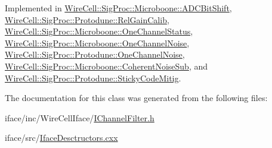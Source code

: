 Implemented in \hyperlink{class_wire_cell_1_1_sig_proc_1_1_microboone_1_1_a_d_c_bit_shift_a6815b2cc680e5fb222239f2875773352}{Wire\+Cell\+::\+Sig\+Proc\+::\+Microboone\+::\+A\+D\+C\+Bit\+Shift}, \hyperlink{class_wire_cell_1_1_sig_proc_1_1_protodune_1_1_rel_gain_calib_afa25d6774f5ea8bf33ba28494ef2a0f4}{Wire\+Cell\+::\+Sig\+Proc\+::\+Protodune\+::\+Rel\+Gain\+Calib}, \hyperlink{class_wire_cell_1_1_sig_proc_1_1_microboone_1_1_one_channel_status_a4719e79f3e553512387a4de632451818}{Wire\+Cell\+::\+Sig\+Proc\+::\+Microboone\+::\+One\+Channel\+Status}, \hyperlink{class_wire_cell_1_1_sig_proc_1_1_microboone_1_1_one_channel_noise_a89d35e0006bd5a44cdd046e2d9549fa4}{Wire\+Cell\+::\+Sig\+Proc\+::\+Microboone\+::\+One\+Channel\+Noise}, \hyperlink{class_wire_cell_1_1_sig_proc_1_1_protodune_1_1_one_channel_noise_ae4c1803fb4849e5a9e73f65d79fdc909}{Wire\+Cell\+::\+Sig\+Proc\+::\+Protodune\+::\+One\+Channel\+Noise}, \hyperlink{class_wire_cell_1_1_sig_proc_1_1_microboone_1_1_coherent_noise_sub_a0c98bcbea0288592dfe6603e92b742b5}{Wire\+Cell\+::\+Sig\+Proc\+::\+Microboone\+::\+Coherent\+Noise\+Sub}, and \hyperlink{class_wire_cell_1_1_sig_proc_1_1_protodune_1_1_sticky_code_mitig_a59d9c2567caa4f84b0e1a2cba57c0b6d}{Wire\+Cell\+::\+Sig\+Proc\+::\+Protodune\+::\+Sticky\+Code\+Mitig}.



The documentation for this class was generated from the following files\+:\begin{DoxyCompactItemize}
\item 
iface/inc/\+Wire\+Cell\+Iface/\hyperlink{_i_channel_filter_8h}{I\+Channel\+Filter.\+h}\item 
iface/src/\hyperlink{_iface_desctructors_8cxx}{Iface\+Desctructors.\+cxx}\end{DoxyCompactItemize}
